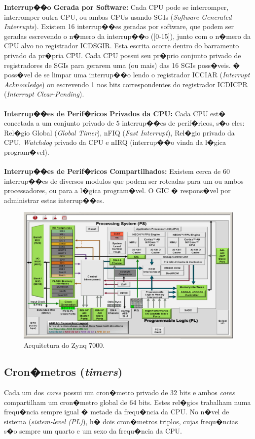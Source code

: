 \documentclass{ufscThesis/ufscThesis} %
\begin{document}
\textbf{Interrup��o Gerada por Software: }
Cada CPU pode se interromper, interromper outra CPU, ou ambas CPUs usando SGIs (\emph{Software Generated Interrupts}). Existem 16 interrup��es geradas por software, que podem ser geradas escrevendo o n�mero da interrup��o ([0-15]), junto com o n�mero da CPU alvo no registrador ICDSGIR. Esta escrita ocorre dentro do barramento privado da pr�pria CPU. Cada CPU possui seu pr�prio conjunto privado de registradores de SGIs para gerarem uma (ou mais) das 16 SGIs poss�veis. � poss�vel de se limpar uma interrup��o lendo o registrador ICCIAR (\emph{Interrupt Acknowledge}) ou escrevendo 1 nos bits correspondentes do registrador ICDICPR (\emph{Interrupt Clear-Pending}).
\\\\
\textbf{Interrup��es de Perif�ricos Privados da CPU: }
Cada CPU est� conectada a um conjunto privado de 5 interrup��es de perif�ricos, s�o eles: Rel�gio Global (\emph{Global Timer}), nFIQ (\emph{Fast Interrupt}), Rel�gio privado da CPU, \emph{Watchdog} privado da CPU e nIRQ (interrup��o vinda da l�gica program�vel).
\\\\
\textbf{Interrup��es de Perif�ricos Compartilhados: }
Existem cerca de 60 interrup��es de diversos modulos que podem ser roteadas para um ou ambos processadores, ou para a l�gica program�vel. O GIC � respons�vel por administrar estas interrup��es.

\begin{figure}[ht!]
    \centering
    \includegraphics[width=15cm]{figuras/zynq-7000}
    \caption{Arquitetura do Zynq 7000.}
\end{figure}

\subsection{Cron�metros (\emph{timers})}
Cada um dos \emph{cores} possui um cron�metro privado de 32 bits e ambos \emph{cores} compartilham um cron�metro global de 64 bits. Estes rel�gios trabalham numa frequ�ncia sempre igual � metade da frequ�ncia da CPU.
No n�vel de sistema (\emph{sistem-level (PL)}), h� dois cron�metros triplos, cujas frequ�ncias s�o sempre um quarto e um sexo da frequ�ncia da CPU.
\end{document}
